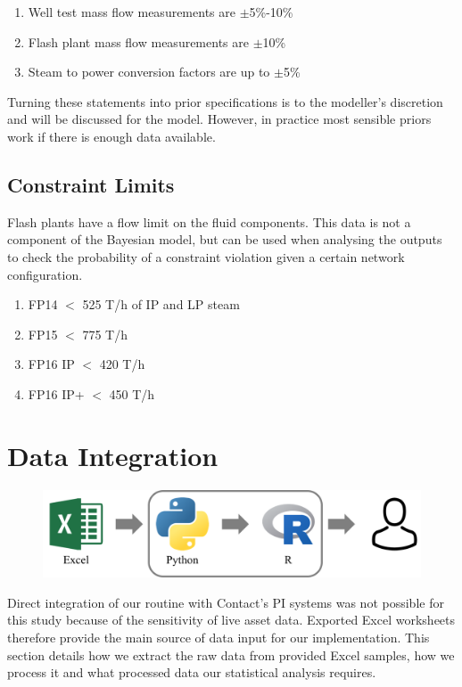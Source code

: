 \documentclass[a4paper, 12pt]{article}
\begin{document}
\begin{enumerate}
\item Well test mass flow measurements are $\pm$5\%-10\%
\item Flash plant mass flow measurements are $\pm$10\%
\item Steam to power conversion factors are up to $\pm$5\%
\end{enumerate}

Turning these statements into prior specifications is to the modeller's discretion and will be discussed for the model. However, in practice most sensible priors work if there is enough data available.

\subsection{Constraint Limits}
Flash plants have a flow limit on the fluid components. This data is not a component of the Bayesian model, but can be used when analysing the outputs to check the probability of a constraint violation given a certain network configuration.
\begin{enumerate}
\item FP14 $<$ 525 T/h of IP and LP steam
\item FP15 $<$ 775 T/h
\item FP16 IP $<$ 420 T/h
\item FP16 IP+ $<$ 450 T/h
\end{enumerate}


\section{Data Integration}

\begin{figure}
  \centering
  \includegraphics[width=0.5\linewidth]{media/workflow}
  \label{fig:workflow}
\end{figure}

Direct integration of our routine with Contact's PI systems was not possible for this study because of the sensitivity of live asset data. Exported Excel worksheets therefore provide the main source of data input for our implementation. This section details how we extract the raw data from provided Excel samples, how we process it and what processed data our statistical analysis requires.
\end{document}
